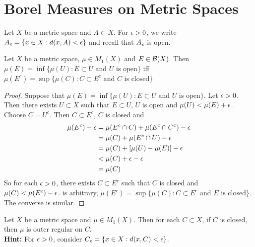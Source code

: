 \documentclass{book}
\begin{document}
	
	\newpage
	\section{Borel Measures on Metric Spaces}
	
	\tcr{}
	
	\begin{note} 
		Let $X$ be a metric space and $A \subset X$. For $\epsilon >0$, we write $A_{\epsilon} = \{x \in X: d(x, A) < \epsilon\}$ and recall that $A_{\epsilon}$ is open.
	\end{note}
	
	\begin{ex} 
		Let $X$ be a metric space, $\mu \in M_1(X)$ and $E \in \mathcal{B}(X)$. Then 
		$\mu(E) = \inf  \{\mu(U): E \subset U \text{ and $U$ is open} \}$ iff $\mu(E^c) = \sup  \{\mu(C): C \subset E^c \text{ and $C$ is closed} \}$ \\
	\end{ex}
	
	\begin{proof}
		Suppose that $\mu(E) = \inf  \{\mu(U): E \subset U \text{ and $U$ is open} \}$. Let $\epsilon >0$. Then there exists $U \subset X$ such that $E \subset U$, $U$ is open and $\mu(U) < \mu(E) + \epsilon$. Choose $C = U^c$. Then $C \subset E^c$, $C$ is closed and 
		\begin{align*}
			\mu(E^c) - \epsilon 
			&= \mu(E^c \cap C) + \mu(E^c \cap C^c) - \epsilon \\
			&= \mu(C) + \mu(E^c \cap U) - \epsilon \\
			&= \mu(C) + [\mu(U) - \mu(E)] - \epsilon \\
			&< \mu(C) + \epsilon - \epsilon \\
			&= \mu(C)
		\end{align*}
		So for each $\epsilon > 0$, there exists $C \subset E^c$ such that $C$ is closed and $\mu(C) < \mu(E^c) - \epsilon$. is arbitrary, $\mu(E^c) = \sup\{\mu(C): C \subset E^c \text{ and $E$ is closed}\}$. \\
		The converse is similar. 
	\end{proof}
	
	\begin{ex} 
		Let $X$ be a metric space and $\mu \in M_1(X)$. Then for each $C \subset X$, if $C$ is closed, then $\mu$ is outer regular on $C$. \\
		\textbf{Hint:} For $\epsilon >0$, consider $C_{\epsilon} = \{x \in X: d(x, C) < \epsilon\}$. 
	\end{ex}
	
\end{document}
